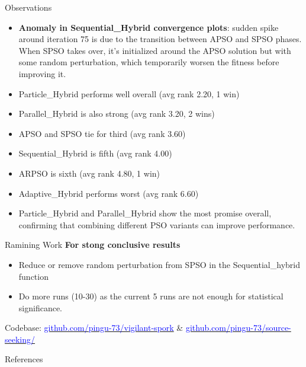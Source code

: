 \documentclass[aspectratio=169]{beamer}
\begin{document}
\begin{frame}{Observations}
    \begin{itemize}
        \item \textbf{Anomaly in Sequential\_Hybrid convergence plots}: sudden spike around iteration 75 is due to the transition between APSO and SPSO phases. When SPSO takes over, it's initialized around the APSO solution but with some random perturbation, which temporarily worsen the fitness before improving it.
    \end{itemize}

    \begin{itemize}
        \item Particle\_Hybrid performs well overall (avg rank 2.20, 1 win)
        \item Parallel\_Hybrid is also strong (avg rank 3.20, 2 wins)
        \item APSO and SPSO tie for third (avg rank 3.60)
        \item Sequential\_Hybrid is fifth (avg rank 4.00)
        \item ARPSO is sixth (avg rank 4.80, 1 win)
        \item Adaptive\_Hybrid performs worst (avg rank 6.60)
        \item Particle\_Hybrid and Parallel\_Hybrid show the most promise overall, confirming that combining different PSO variants can improve performance.
    \end{itemize}
\end{frame}

\begin{frame}{Ramining Work}
\textbf{For stong conclusive results}
    \begin{itemize}
        \item Reduce or remove random perturbation from SPSO in the Sequential\_hybrid function
        \item Do more runs (10-30) as the current 5 runs are not enough for statistical significance.
    \end{itemize}
    Codebase: \href{https://github.com/pingu-73/vigilant-spork}{\textcolor{blue}{github.com/pingu-73/vigilant-spork}} \& \href{https://github.com/pingu-73/source-seeking/}{\textcolor{blue}{github.com/pingu-73/source-seeking/}}
\end{frame}

\begin{frame}{References}
    
        
\end{frame}
\end{document}
